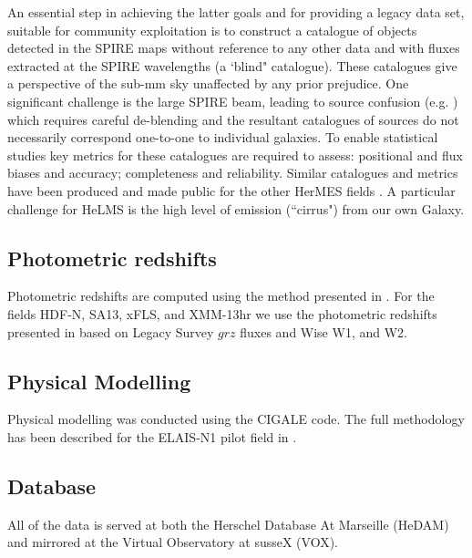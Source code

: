 \documentclass[usenatbib]{mnras}
\begin{document}
An essential step in achieving the latter goals and for providing a legacy data
set, suitable for community exploitation is to construct a catalogue of objects
detected in the SPIRE maps without reference to any other data and with fluxes
extracted at the SPIRE wavelengths (a `blind" catalogue).  These catalogues give
a perspective of the sub-mm sky unaffected by any prior prejudice. One
significant challenge is the large SPIRE beam, leading to source confusion (e.g.
\citealt{Nguyen:2010lr}) which requires careful de-blending and the resultant
catalogues of sources do not necessarily correspond one-to-one to individual
galaxies.   To enable statistical studies key metrics for these catalogues are
required to assess: positional and flux biases and accuracy; completeness and
reliability.   Similar catalogues and metrics have been produced and made public
for the other HerMES fields \citep{Smith:2012lr,Wang:2013lr}. A particular
challenge for HeLMS is the high level of emission (``cirrus") from our own
Galaxy.

\subsection[Photometric redshifts\\{color{red} A summary of Ken's paper(s) and any details of exactly what is done for DR1 that is not included in those.}]{Photometric redshifts}

Photometric redshifts are computed using the method presented in \citep{Duncan:2017, Duncan:2018}. For the fields HDF-N, SA13, xFLS, and XMM-13hr we use the photometric redshifts presented in \cite{Zou:2019} based on Legacy Survey $grz$ fluxes and Wise W1, and W2.

\subsection[Physical Modelling\\{color{red} A summary of Kassia's paper(s) and any details of exactly what is done for DR1 that is not included in those.}]{Physical Modelling}

Physical modelling was conducted using the CIGALE code. The full methodology has been described for the ELAIS-N1 pilot field in \citep{Malek:2018}.



\subsection[Database\\{color{red} needs some thought.}]{Database}
All of the data is served at both the Herschel Database At Marseille (HeDAM) and mirrored at the Virtual Observatory at susseX (VOX).
\end{document}
